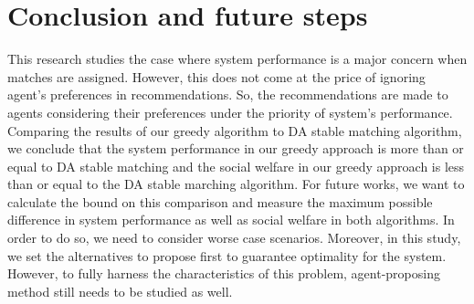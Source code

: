 \documentclass[11pt, letterpaper]{article}
\begin{document}
\section{Conclusion and future steps}
This research studies the case where system performance is a major concern when matches are assigned. However, this does not come at the price of ignoring agent's preferences in recommendations. So, the recommendations are made to agents considering their preferences under the priority of system's performance. Comparing the results of our greedy algorithm to DA stable matching algorithm, we conclude that the system performance in our greedy approach is more than or equal to DA stable matching and the social welfare in our greedy approach is less than or equal to the DA stable marching algorithm. 
For future works, we want to calculate the bound on this comparison and measure the maximum possible difference in system performance as well as social welfare in both algorithms. In order to do so, we need to consider worse case scenarios. 
Moreover, in this study, we set the alternatives to propose first to guarantee optimality for the system. However, to fully harness the characteristics of this problem, agent-proposing method still needs to be studied as well. 

\newpage
%
\setcounter{page}{1}

\end{document}
